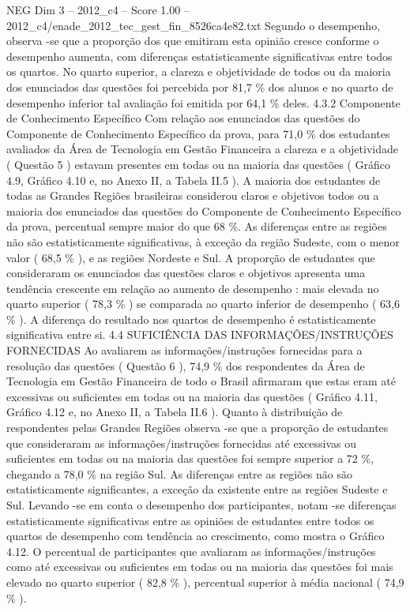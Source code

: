 \begin{textsample}{NEG Dim 3 – 2012\_c4 – Score 1.00 – 2012\_c4/enade\_2012\_tec\_gest\_fin\_8526ca4e82.txt}
Segundo o desempenho, observa -se que a proporção dos que emitiram esta opinião cresce conforme o desempenho aumenta, com diferenças estatisticamente significativas entre todos os quartos.
No quarto superior, a clareza e objetividade de todos ou da maioria dos enunciados das questões foi percebida por 81,7 \% dos alunos e no quarto de desempenho inferior tal avaliação foi emitida por 64,1 \% deles. 4.3.2 Componente de Conhecimento Específico Com relação aos enunciados das questões do Componente de Conhecimento Específico da prova, para 71,0 \% dos estudantes avaliados da Área de Tecnologia em Gestão Financeira a clareza e a objetividade ( Questão 5 ) estavam presentes em todas ou na maioria das questões ( Gráfico 4.9, Gráfico 4.10 e, no Anexo II, a Tabela II.5 ).
A maioria dos estudantes de todas as Grandes Regiões brasileiras considerou claros e objetivos todos ou a maioria dos enunciados das questões do Componente de Conhecimento Específico da prova, percentual sempre maior do que 68 \%.
As diferenças entre as regiões não são estatisticamente significativas, à exceção da região Sudeste, com o menor valor ( 68,5 \% ), e as regiões Nordeste e Sul.
A proporção de estudantes que consideraram os enunciados das questões claros e objetivos apresenta uma tendência crescente em relação ao aumento de desempenho : mais elevada no quarto superior ( 78,3 \% ) se comparada ao quarto inferior de desempenho ( 63,6 \% ).
A diferença do resultado nos quartos de desempenho é estatisticamente significativa entre si. 4.4 SUFICIÊNCIA DAS INFORMAÇÕES/INSTRUÇÕES FORNECIDAS Ao avaliarem as informações/instruções fornecidas para a resolução das questões ( Questão 6 ), 74,9 \% dos respondentes da Área de Tecnologia em Gestão Financeira de todo o Brasil afirmaram que estas eram até excessivas ou suficientes em todas ou na maioria das questões ( Gráfico 4.11, Gráfico 4.12 e, no Anexo II, a Tabela II.6 ).
Quanto à distribuição de respondentes pelas Grandes Regiões observa -se que a proporção de estudantes que consideraram as informações/instruções fornecidas até excessivas ou suficientes em todas ou na maioria das questões foi sempre superior a 72 \%, chegando a 78,0 \% na região Sul.
As diferenças entre as regiões não são estatisticamente significantes, a exceção da existente entre as regiões Sudeste e Sul.
Levando -se em conta o desempenho dos participantes, notam -se diferenças estatisticamente significativas entre as opiniões de estudantes entre todos os quartos de desempenho com tendência ao crescimento, como mostra o Gráfico 4.12.
O percentual de participantes que avaliaram as informações/instruções como até excessivas ou suficientes em todas ou na maioria das questões foi mais elevado no quarto superior ( 82,8 \% ), percentual superior à média nacional ( 74,9 \% ).

\end{textsample}
